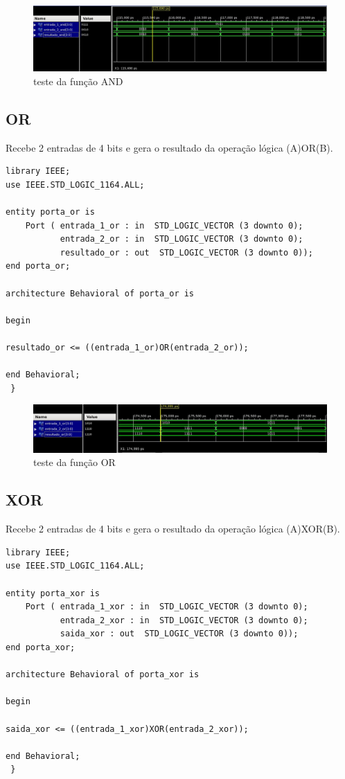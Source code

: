 \documentclass[a4paper,12pt,twoside]{article}
\begin{document}
 \begin{figure}[H]
\centering
\includegraphics[scale=0.55]{testes/AND2.jpeg}
\caption{teste da função AND}
\label{fig:diagrama}
\end{figure}

 
 
\subsection{OR}
Recebe 2 entradas de 4 bits e gera o resultado da operação lógica (A)OR(B).

\begin{lstlisting}
library IEEE;
use IEEE.STD_LOGIC_1164.ALL;

entity porta_or is
    Port ( entrada_1_or : in  STD_LOGIC_VECTOR (3 downto 0);
           entrada_2_or : in  STD_LOGIC_VECTOR (3 downto 0);
           resultado_or : out  STD_LOGIC_VECTOR (3 downto 0));
end porta_or;

architecture Behavioral of porta_or is

begin

resultado_or <= ((entrada_1_or)OR(entrada_2_or));

end Behavioral;
 } \end{lstlisting}
 
  \begin{figure}[H]
\centering
\includegraphics[scale=0.6]{testes/or2.jpeg}
\caption{teste da função OR}
\label{fig:diagrama}
\end{figure}
 
 
\subsection{XOR}
Recebe 2 entradas de 4 bits e gera o resultado da operação lógica (A)XOR(B).

\begin{lstlisting}
library IEEE;
use IEEE.STD_LOGIC_1164.ALL;

entity porta_xor is
    Port ( entrada_1_xor : in  STD_LOGIC_VECTOR (3 downto 0);
           entrada_2_xor : in  STD_LOGIC_VECTOR (3 downto 0);
           saida_xor : out  STD_LOGIC_VECTOR (3 downto 0));
end porta_xor;

architecture Behavioral of porta_xor is

begin

saida_xor <= ((entrada_1_xor)XOR(entrada_2_xor));

end Behavioral;
 } \end{lstlisting}
 
\end{document}

